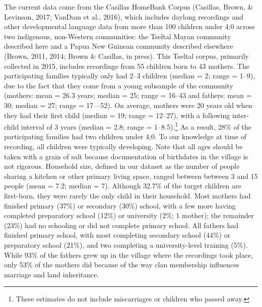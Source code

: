 \documentclass[floatsintext,man]{apa6}
\theoremstyle{definition}
\theoremstyle{definition}
\theoremstyle{definition}
\theoremstyle{remark}
\begin{document}
The current data come from the Casillas HomeBank Corpus (Casillas,
Brown, \& Levinson, 2017; VanDam et al., 2016), which includes daylong
recordings and other developmental language data from more than 100
children under 4;0 across two indigenous, non-Western communities: the
Tseltal Mayan community described here and a Papua New Guinean community
described elsewhere (Brown, 2011, 2014; Brown \& Casillas, in press).
This Tseltal corpus, primarily collected in 2015, includes recordings
from 55 children born to 43 mothers. The participating families
typically only had 2--3 children (median = 2; range = 1--9), due to the
fact that they come from a young subsample of the community (mothers:
mean = 26.3 years; median = 25; range = 16--43 and fathers: mean = 30;
median = 27; range = 17---52). On average, mothers were 20 years old
when they had their first child (median = 19; range = 12--27), with a
following inter-child interval of 3 years (median = 2.8; range =
1--8.5).\footnote{These estimates do not include miscarriages or
  children who passed away.} As a result, 28\% of the participating
families had two children under 4;0. To our knowledge at time of
recording, all children were typically developing. Note that all ages
should be taken with a grain of salt because documentation of birthdates
in the village is not rigorous. Household size, defined in our dataset
as the number of people sharing a kitchen or other primary living space,
ranged between between 3 and 15 people (mean = 7.2; median = 7).
Although 32.7\% of the target children are first-born, they were rarely
the only child in their household. Most mothers had finished primary
(37\%) or secondary (30\%) school, with a few more having completed
preparatory school (12\%) or university (2\%; 1 mother); the remainder
(23\%) had no schooling or did not complete primary school. All fathers
had finished primary school, with most completing secondary school
(44\%) or preparatory school (21\%), and two completing a
university-level training (5\%). While 93\% of the fathers grew up in
the village where the recordings took place, only 53\% of the mothers
did because of the way clan membership influences marriage and land
inheritance.
\end{document}
